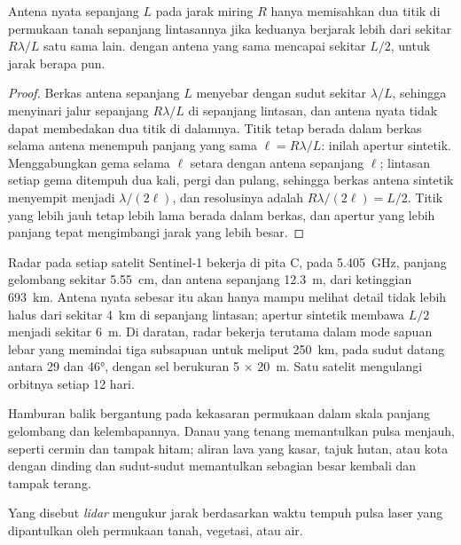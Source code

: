 \begin{proposition}\label{prop:b3:remote-sensing-gis:azimuth}
Antena nyata sepanjang $L$ pada jarak miring $R$ hanya memisahkan dua titik
di permukaan tanah sepanjang lintasannya jika keduanya berjarak lebih dari sekitar $R\lambda/L$
satu sama lain.  dengan antena yang sama mencapai sekitar $L/2$,
untuk jarak berapa pun.
\end{proposition}

\begin{proof}
Berkas antena sepanjang $L$ menyebar dengan sudut sekitar
$\lambda/L$, sehingga menyinari jalur sepanjang $R\lambda/L$ di sepanjang lintasan, dan
antena nyata tidak dapat membedakan dua titik di dalamnya. Titik tetap berada dalam
berkas selama antena menempuh panjang yang sama $\ell = R\lambda/L$:
inilah apertur sintetik. Menggabungkan gema selama $\ell$ setara dengan
antena sepanjang $\ell$; lintasan setiap gema
ditempuh dua kali, pergi dan pulang, sehingga berkas antena sintetik
menyempit menjadi $\lambda/(2\ell)$, dan resolusinya adalah $R\lambda/(2\ell) =
L/2$. Titik yang lebih jauh tetap lebih lama berada dalam berkas, dan apertur yang lebih panjang
tepat mengimbangi jarak yang lebih besar.
\end{proof}

Radar pada setiap satelit Sentinel-1 bekerja di pita C, pada
\qty{5.405}{GHz}, panjang gelombang sekitar \qty{5.55}{cm}, dan antena
sepanjang \qty{12.3}{m}, dari ketinggian \qty{693}{km}. Antena nyata sebesar itu akan
hanya mampu melihat detail tidak lebih halus dari sekitar \qty{4}{km} di sepanjang lintasan; apertur sintetik
membawa $L/2$ menjadi sekitar \qty{6}{m}. Di daratan, radar bekerja terutama dalam
mode sapuan lebar yang memindai tiga subsapuan untuk meliput \qty{250}{km}, pada
sudut datang antara 29 dan \ang{46}, dengan sel berukuran 5 × \qty{20}{m}.
Satu satelit mengulangi orbitnya setiap 12 hari.

Hamburan balik bergantung pada kekasaran permukaan dalam skala
panjang gelombang dan kelembapannya. Danau yang tenang memantulkan pulsa menjauh, seperti
cermin dan tampak hitam; aliran lava yang kasar, tajuk hutan, atau kota dengan dinding
dan sudut-sudut memantulkan sebagian besar kembali dan tampak terang.

\begin{definition}[Lidar]\label{def:b3:remote-sensing-gis:lidar}
Yang disebut \emph{lidar} mengukur jarak berdasarkan waktu tempuh pulsa laser
yang dipantulkan oleh permukaan tanah, vegetasi, atau air.
\end{definition}

